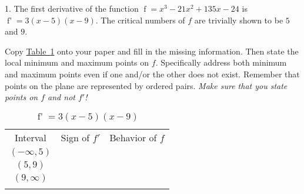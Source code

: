 \documentclass[12pt,]{book}
\theoremstyle{plain}
\theoremstyle{definition}
\numberwithin{equation}{section}
\newcommand{\hrulethin}  {\noalign{\hrule height 0.04em}}
\newcommand{\hrulemedium}{\noalign{\hrule height 0.07em}}
\newcommand{\hrulethick} {\noalign{\hrule height 0.11em}}
\providecommand\phantomsection{}
\newcommand{\fe}[2]{\mathop{{#1}{\left(#2\right)}}}
\newcommand{\ointerval}[2]{\left(#1,#2\right)}
\newcommand{\fd}[1]{#1'}
\begin{document}
\begin{exerciselist}
\item[1.]\phantomsection\hypertarget{exercise-412}{\null}The first derivative of the function \(\fe{f}{x}=x^3-21x^2+135x-24\) is \(\fe{\fd{f}}{x}=3(x-5)(x-9)\). The critical numbers of \(f\) are trivially shown to be \(5\) and \(9\).%
\par
Copy \hyperref[table-polynomial-sign-table]{Table~\ref*{table-polynomial-sign-table}} onto your paper and fill in the missing information.  Then state the local minimum and maximum points on \(f\).  Specifically address both minimum and maximum points even if one and/or the other does not exist.  Remember that points on the plane are represented by ordered pairs. \emph{Make sure that you state points on \(f\) and not \(\fd{f}\)!}%
\begin{table}
\centering
\caption{\(\fe{\fd{f}}{x}=3(x-5)(x-9)\)\label{table-polynomial-sign-table}}
\begin{tabular}{ccc}\hrulethick
Interval&Sign of \(\fd{f}\)&Behavior of \(f\)\\\hrulemedium
\(\ointerval{-\infty}{5}\)&&\\\hrulethin
\(\ointerval{5}{9}\)&&\\\hrulethin
\(\ointerval{9}{\infty}\)&&\\\hrulethick
\end{tabular}
\end{table}
\par\smallskip
\end{exerciselist}
\end{document}
